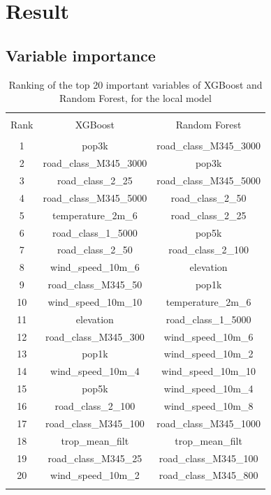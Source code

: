 \documentclass{article}
\begin{document}
\section{Result}
\subsection{Variable importance}

\begin{table}[!htbp] \centering 
  \caption{Ranking of the top 20 important variables of XGBoost and Random Forest, for the local model} 
    \label{nlde_vimp} 
\begin{tabular}{@{\extracolsep{5pt}} ccc} 
\\[-1.8ex]\hline 
\hline \\[-1.8ex] 
Rank & XGBoost & Random Forest \\ 
\hline \\[-1.8ex] 
1 & pop3k & road\_class\_M345\_3000 \\ 
2 & road\_class\_M345\_3000 & pop3k \\ 
3 & road\_class\_2\_25 & road\_class\_M345\_5000 \\ 
4 & road\_class\_M345\_5000 & road\_class\_2\_50 \\ 
5 & temperature\_2m\_6 & road\_class\_2\_25 \\ 
6 & road\_class\_1\_5000 & pop5k \\ 
7 & road\_class\_2\_50 & road\_class\_2\_100 \\ 
8 & wind\_speed\_10m\_6 & elevation \\ 
9 & road\_class\_M345\_50 & pop1k \\ 
10 & wind\_speed\_10m\_10 & temperature\_2m\_6 \\ 
11 & elevation & road\_class\_1\_5000 \\ 
12 & road\_class\_M345\_300 & wind\_speed\_10m\_6 \\ 
13 & pop1k & wind\_speed\_10m\_2 \\ 
14 & wind\_speed\_10m\_4 & wind\_speed\_10m\_10 \\ 
15 & pop5k & wind\_speed\_10m\_4 \\ 
16 & road\_class\_2\_100 & wind\_speed\_10m\_8 \\ 
17 & road\_class\_M345\_100 & road\_class\_M345\_1000 \\ 
18 & trop\_mean\_filt & trop\_mean\_filt \\ 
19 & road\_class\_M345\_25 & road\_class\_M345\_100 \\ 
20 & wind\_speed\_10m\_2 & road\_class\_M345\_800 \\ 
\hline \\[-1.8ex] 
\end{tabular} 
\end{table} 
\end{document}
